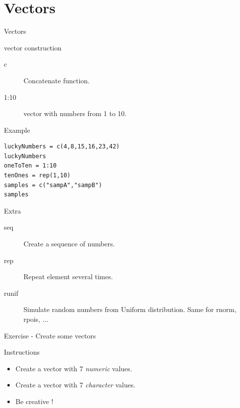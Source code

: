 \documentclass[10pt]{beamer}
\begin{document}
\section{Vectors}
\begin{frame}[fragile]{Vectors}
  \begin{block}{{\sf vector} construction}
    \begin{description}
    \item[c] Concatenate function.
    \item[1:10] {\sf vector} with numbers from 1 to 10.
    \end{description}
  \end{block}
  \begin{exampleblock}{Example}
\begin{verbatim}
luckyNumbers = c(4,8,15,16,23,42) 
luckyNumbers
oneToTen = 1:10
tenOnes = rep(1,10)
samples = c("sampA","sampB")
samples
\end{verbatim}
  \end{exampleblock}

\begin{alertblock}{Extra}
  \begin{description}
  \item[seq] Create a sequence of numbers.
  \item[rep] Repeat element several times.
  \item[runif] Simulate random numbers from Uniform distribution. Same for {\sf rnorm}, {\sf rpois}, ...
  \end{description}
\end{alertblock}

\end{frame}

\begin{frame}{Exercise - Create some vectors}
  \begin{block}{Instructions}
    \begin{itemize}
    \item Create a {\sf vector} with 7 {\it numeric} values.
    \item Create a {\sf vector} with 7 {\it character} values.
    \item Be creative !
    \end{itemize}
  \end{block}
\end{frame}
\end{document}
